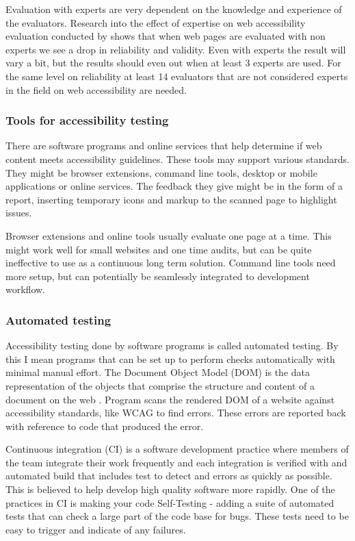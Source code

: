 \documentclass{master_thesis}
\begin{document}
Evaluation with experts are very dependent on the knowledge and experience of the evaluators. Research into the effect of expertise on web accessibility evaluation conducted by \citeauthor{Brajnik2011} shows that when web pages are evaluated with non experts we see a drop in reliability and validity. Even with experts the result will vary a bit, but the results should even out when at least 3 experts are used. For the same level on reliability at least 14 evaluators that are not considered experts in the field on web accessibility are needed. \citep{Brajnik2011}

\subsubsection{Tools for accessibility testing}

There are software programs and online services that help determine if web content meets accessibility guidelines. These tools may support various standards. They might be browser extensions, command line tools, desktop or mobile applications or online services. The feedback they give might be in the form of a report, inserting temporary icons and markup to the scanned page to highlight issues. \citep{AbouZahra2017}

Browser extensions and online tools usually evaluate one page at a time. This might work well for small websites and one time audits, but can be quite ineffective to use as a continuous long term solution. Command line tools need more setup, but can potentially be seamlessly integrated to development workflow.

\subsubsection{Automated testing}

Accessibility testing done by software programs is called automated testing. By this I mean programs that can be set up to perform checks automatically with minimal manual effort. The Document Object Model (DOM) is the data representation of the objects that comprise the structure and content of a document on the web \citep{MDN2023}. Program scans the rendered DOM of a website against accessibility standards, like WCAG to find errors. These errors are reported back with reference to code that produced the error.

Continuous integration (CI) is a software development practice where members of the team integrate their work frequently and each integration is verified with and automated build that includes test to detect and errors as quickly as possible. This is believed to help develop high quality software more rapidly. One of the practices in CI is making your code Self-Testing - adding a suite of automated tests that can check a large part of the code base for bugs. These tests need to be easy to trigger and indicate of any failures.
\citep{Fowler2006}
\end{document}

